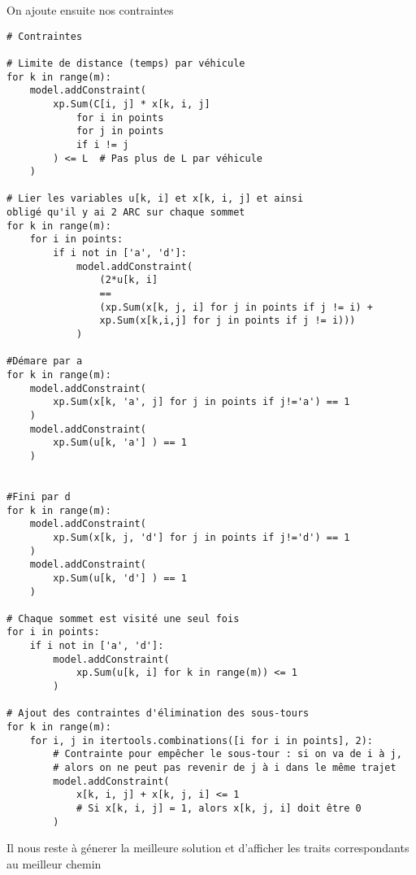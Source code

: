 \documentclass[a4paper, 12pt, DIV=12]{scrartcl}
\begin{document}
On ajoute ensuite nos contraintes\\[5pt]
\begin{verbatim}
# Contraintes

# Limite de distance (temps) par véhicule
for k in range(m):
    model.addConstraint(
        xp.Sum(C[i, j] * x[k, i, j] 
            for i in points 
            for j in points 
            if i != j
        ) <= L  # Pas plus de L par véhicule
    )

# Lier les variables u[k, i] et x[k, i, j] et ainsi 
obligé qu'il y ai 2 ARC sur chaque sommet
for k in range(m):
    for i in points:
        if i not in ['a', 'd']:
            model.addConstraint(
                (2*u[k, i] 
                == 
                (xp.Sum(x[k, j, i] for j in points if j != i) + 
                xp.Sum(x[k,i,j] for j in points if j != i)))
            )
    
#Démare par a
for k in range(m):
    model.addConstraint(
        xp.Sum(x[k, 'a', j] for j in points if j!='a') == 1
    )
    model.addConstraint(
        xp.Sum(u[k, 'a'] ) == 1
    )


#Fini par d
for k in range(m):
    model.addConstraint(
        xp.Sum(x[k, j, 'd'] for j in points if j!='d') == 1
    )
    model.addConstraint(
        xp.Sum(u[k, 'd'] ) == 1
    )

# Chaque sommet est visité une seul fois
for i in points:
    if i not in ['a', 'd']:
        model.addConstraint(
            xp.Sum(u[k, i] for k in range(m)) <= 1
        )

# Ajout des contraintes d'élimination des sous-tours
for k in range(m):
    for i, j in itertools.combinations([i for i in points], 2):
        # Contrainte pour empêcher le sous-tour : si on va de i à j, 
        # alors on ne peut pas revenir de j à i dans le même trajet
        model.addConstraint(
            x[k, i, j] + x[k, j, i] <= 1  
            # Si x[k, i, j] = 1, alors x[k, j, i] doit être 0
        )

\end{verbatim}
Il nous reste à génerer la meilleure solution et d'afficher les traits correspondants au meilleur chemin\\
\end{document}
